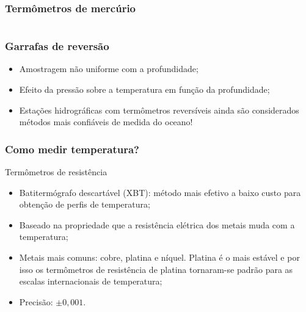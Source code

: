 \begin{frame}
\frametitle{Termômetros de mercúrio}
    \begin{columns}
        \begin{column}{0.5\textwidth}
    \begin{center}
    \end{center}
        \end{column}
    \begin{column}{0.5\textwidth}
    \begin{center}
    \end{center}
    \end{column}
    \end{columns}
\end{frame}

\begin{frame}
\frametitle{Garrafas de reversão}
    \small{
    \begin{itemize}[<+-| alert@+>]
    \item Amostragem não uniforme com a profundidade;
    \item Efeito da pressão sobre a temperatura em função da profundidade;
    \item Estações hidrográficas com termômetros reversíveis ainda são
          considerados métodos mais confiáveis de medida do oceano!
    \end{itemize}
    }
\end{frame}

\begin{frame}
\frametitle{Como medir temperatura?}
    Termômetros de resistência
    \small{
    \begin{itemize}[<+-| alert@+>]
    \item Batitermógrafo descartável (XBT): método mais efetivo a baixo custo
          para obtenção de perfis de temperatura;
    \item Baseado na propriedade que a resistência elétrica dos metais muda
          com a temperatura;
    \item Metais mais comuns: cobre, platina e níquel. Platina é o mais
          estável e por isso os termômetros de resistência de platina
          tornaram-se padrão para as escalas internacionais de temperatura;
    \item Precisão: $\pm 0,001$\textcelsius.

    \end{itemize}
    }
\end{frame}

